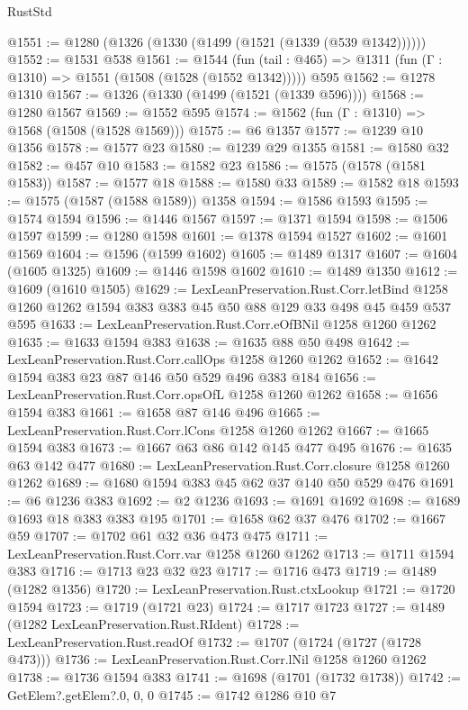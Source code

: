 \begin{lexlean}{RustStd}
\begin{coremodule}
@1551 := @1280 (@1326 (@1330 (@1499 (@1521 (@1339 (@539 @1342))))))
@1552 := @1531 @538
@1561 := @1544
    (fun (tail : @465) => @1311 (fun (Γ : @1310) => @1551 (@1508 (@1528 (@1552 @1342)))))
    @595
@1562 := @1278 @1310
@1567 := @1326 (@1330 (@1499 (@1521 (@1339 @596))))
@1568 := @1280 @1567
@1569 := @1552 @595
@1574 := @1562 (fun (Γ : @1310) => @1568 (@1508 (@1528 @1569)))
@1575 := @6 @1357
@1577 := @1239 @10 @1356
@1578 := @1577 @23
@1580 := @1239 @29 @1355
@1581 := @1580 @32
@1582 := @457 @10
@1583 := @1582 @23
@1586 := @1575 (@1578 (@1581 @1583))
@1587 := @1577 @18
@1588 := @1580 @33
@1589 := @1582 @18
@1593 := @1575 (@1587 (@1588 @1589)) @1358
@1594 := @1586 @1593
@1595 := @1574 @1594
@1596 := @1446 @1567
@1597 := @1371 @1594
@1598 := @1506 @1597
@1599 := @1280 @1598
@1601 := @1378 @1594 @1527
@1602 := @1601 @1569
@1604 := @1596 (@1599 @1602)
@1605 := @1489 @1317
@1607 := @1604 (@1605 @1325)
@1609 := @1446 @1598 @1602
@1610 := @1489 @1350
@1612 := @1609 (@1610 @1505)
@1629 := LexLeanPreservation.Rust.Corr.letBind
    @1258
    @1260
    @1262
    @1594
    @383
    @383
    @45
    @50
    @88
    @129
    @33
    @498
    @45
    @459
    @537
    @595
@1633 := LexLeanPreservation.Rust.Corr.eOfBNil @1258 @1260 @1262
@1635 := @1633 @1594 @383
@1638 := @1635 @88 @50 @498
@1642 := LexLeanPreservation.Rust.Corr.callOps @1258 @1260 @1262
@1652 := @1642 @1594 @383 @23 @87 @146 @50 @529 @496 @383 @184
@1656 := LexLeanPreservation.Rust.Corr.opsOfL @1258 @1260 @1262
@1658 := @1656 @1594 @383
@1661 := @1658 @87 @146 @496
@1665 := LexLeanPreservation.Rust.Corr.lCons @1258 @1260 @1262
@1667 := @1665 @1594 @383
@1673 := @1667 @63 @86 @142 @145 @477 @495
@1676 := @1635 @63 @142 @477
@1680 := LexLeanPreservation.Rust.Corr.closure @1258 @1260 @1262
@1689 := @1680 @1594 @383 @45 @62 @37 @140 @50 @529 @476
@1691 := @6 @1236 @383
@1692 := @2 @1236
@1693 := @1691 @1692
@1698 := @1689 @1693 @18 @383 @383 @195
@1701 := @1658 @62 @37 @476
@1702 := @1667 @59
@1707 := @1702 @61 @32 @36 @473 @475
@1711 := LexLeanPreservation.Rust.Corr.var @1258 @1260 @1262
@1713 := @1711 @1594 @383
@1716 := @1713 @23 @32 @23
@1717 := @1716 @473
@1719 := @1489 (@1282 @1356)
@1720 := LexLeanPreservation.Rust.ctxLookup
@1721 := @1720 @1594
@1723 := @1719 (@1721 @23)
@1724 := @1717 @1723
@1727 := @1489 (@1282 LexLeanPreservation.Rust.RIdent)
@1728 := LexLeanPreservation.Rust.readOf
@1732 := @1707 (@1724 (@1727 (@1728 @473)))
@1736 := LexLeanPreservation.Rust.Corr.lNil @1258 @1260 @1262
@1738 := @1736 @1594 @383
@1741 := @1698 (@1701 (@1732 @1738))
@1742 := GetElem?.getElem?.{0, 0, 0}
@1745 := @1742 @1286 @10 @7

\end{coremodule}
\end{lexlean}
